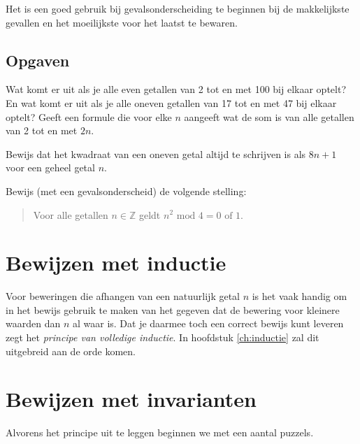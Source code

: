 Het is een goed gebruik bij gevalsonderscheiding te beginnen bij de makkelijkste gevallen en het moeilijkste voor het laatst te bewaren.

\subsection{Opgaven}
\begin{exercise}[Optioneel]
Wat komt er uit als je alle even getallen van 2 tot en met 100 bij elkaar optelt? En wat komt er uit als je alle oneven getallen van 17 tot en met 47 bij elkaar optelt? Geeft een formule die voor elke $n$ aangeeft wat de som is van alle getallen van 2 tot en met $2n$.
\end{exercise}

\begin{exercise}[Optioneel]
Bewijs dat het kwadraat van een oneven getal altijd te schrijven is als $8n+1$ voor een geheel getal $n$.
\end{exercise}

\begin{exercise}[Optioneel]
Bewijs (met een gevalsonderscheid) de volgende stelling:
\begin{quote}
    Voor alle getallen $n\in\mathbb{Z}$ geldt $n^2 \text{ mod } 4 = 0\text{ of }1$.
\end{quote}
\end{exercise}

\section{Bewijzen met inductie}
Voor beweringen die afhangen van een natuurlijk getal $n$ is het vaak handig om in het bewijs gebruik te maken van het gegeven dat de bewering voor kleinere waarden dan $n$ al waar is. Dat je daarmee toch een correct bewijs kunt leveren zegt het \textit{principe van volledige inductie}. In hoofdstuk \ref{ch:inductie} zal dit uitgebreid aan de orde komen.

\section{Bewijzen met invarianten}
Alvorens het principe uit te leggen beginnen we met een aantal puzzels.

